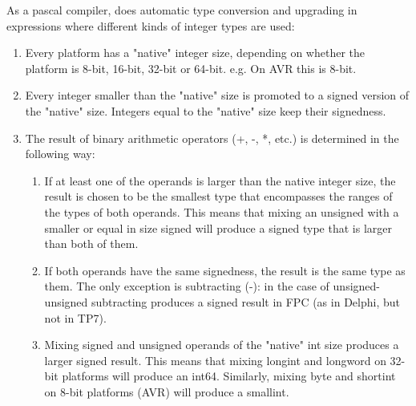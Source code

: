 As a pascal compiler, \fpc does automatic type conversion and upgrading 
in expressions where different kinds of integer types are used:
\begin{enumerate}
\item Every platform has a "native" integer size, depending on whether the
platform is 8-bit, 16-bit, 32-bit or 64-bit. e.g. On AVR this is 8-bit.
\item Every integer smaller than the "native" size is promoted to a signed
version of the "native" size. Integers equal to the "native" size keep their
signedness.
\item The result of binary arithmetic operators (+, -, *, etc.) is determined
in the following way:
\begin{enumerate}
\item If at least one of the operands is larger than the native integer size,
the result is chosen to be the smallest type that encompasses the ranges of
the types of both operands. This means that mixing an unsigned with a
smaller or equal in size signed will produce a signed type that is larger
than both of them.
\item If both operands have the same signedness, the result is the same
type as them. The only exception is subtracting (-): in the case of unsigned-unsigned
subtracting produces a signed result in FPC (as in Delphi, but not in TP7).
\item Mixing signed and unsigned operands of the "native" int size produces
a larger signed result. This means that mixing longint and longword on
32-bit platforms will produce an int64. Similarly, mixing byte and shortint on
8-bit platforms (AVR) will produce a smallint.
\end{enumerate}
\end{enumerate}

% 
%
